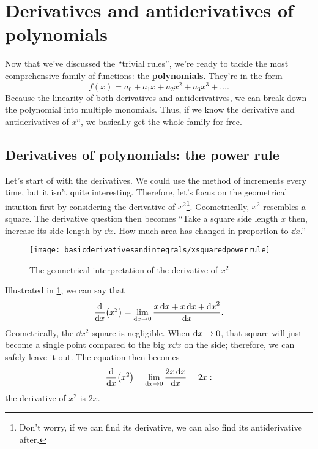 \section{Derivatives and antiderivatives of polynomials}

Now that we've discussed the ``trivial rules'', we're ready to tackle the most comprehensive family of functions: the \textbf{polynomials}. They're in the form
\begin{equation*}
    f(x) = a_0 + a_1x + a_2x^2 + a_3x^3 + \dots.
\end{equation*}
Because the linearity of both derivatives and antiderivatives, we can break down the polynomial into multiple monomials. Thus, if we know the derivative and antiderivatives of $x^n$, we basically get the whole family for free.

\subsection{Derivatives of polynomials: the power rule}
\label{sec:derivativespowerrule}

Let's start of with the derivatives. We could use the method of increments every time, but it isn't quite interesting. Therefore, let's focus on the geometrical intuition first by considering the derivative of $x^2$\footnote{Don't worry, if we can find its derivative, we can also find its antiderivative after.}. Geometrically, $x^2$ resembles a square. The derivative question then becomes ``Take a square side length $x$ then, increase its side length by $\dd{x}$. How much area has changed in proportion to $\dd{x}$.''

\begin{figure}[b]
    \centering
    \texttt{[image: basicderivativesandintegrals/xsquaredpowerrule]}
    \caption{The geometrical interpretation of the derivative of $x^2$}
    \label{fig:xsquaredpowerrule}
\end{figure}
Illustrated in \cref{fig:xsquaredpowerrule}, we can say that
\begin{equation}
    \dv{x}(x^2) = \lim_{\dd{x} \rightarrow 0} \frac{x\dd{x} + x\dd{x} + \dd{x}^2}{\dd{x}}. \label{eq:xsquaredpowerrule}
\end{equation}
Geometrically, the $\dd{x}^2$ square is negligible. When $\dd{x} \rightarrow 0$, that square will just become a single point compared to the big $x\dd{x}$ on the side; therefore, we can safely leave it out. The equation then becomes
\begin{align*}
    \dv{x}(x^2) = \lim_{\dd{x} \rightarrow 0}\frac{2x\dd{x}}{\dd{x}} = 2x:
\end{align*}
the derivative of $x^2$ is $2x$.

